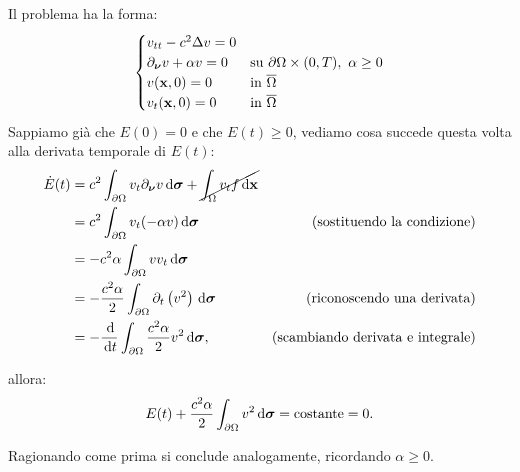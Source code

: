 \begin{dimostrazione}
\begin{itemize}
              Il problema ha la forma:
              \begin{equation*}
                  \begin{cases}
                      v_{tt} -c^{2} \Delta v=0           &                                                                \\
                      \partial _{\bm{\nu }} v+\alpha v=0 & \text{su} \ \partial \Omega \times (0,T) ,\ \alpha \geq 0 \\
                      v(\mathbf{x} ,0) =0                        & \text{in} \ \overline{\Omega }                                 \\
                      v_{t}(\mathbf{x} ,0) =0                    & \text{in} \ \overline{\Omega }
                  \end{cases}
              \end{equation*}Sappiamo già che $E(0) =0$ e che $E(t) \geq 0$, vediamo cosa succede questa volta alla derivata temporale di $E(t)$:
              \begin{align*}
                  \dot{E}(t) & =c^{2}\int _{\partial \Omega } v_{t} \partial _{\bm{\nu }} v\,\mathrm d \bm{\sigma} +\cancel{\int _{\Omega } v_{t} f\,\mathrm d \mathbf{x}} &                                          \\
                             & =c^{2}\int _{\partial \Omega } v_{t}(-\alpha v) \,\mathrm d \bm{\sigma}                                                   & \text{(sostituendo la condizione)}       \\
                             & =-c^{2} \alpha \int _{\partial \Omega } vv_{t} \,\mathrm d \bm{\sigma}                                                    &                                          \\
                             & =-\frac{c^{2} \alpha }{2}\int _{\partial \Omega } \partial _{t}\left(v^{2}\right) \,\mathrm d \bm{\sigma}                 & \text{(riconoscendo una derivata)}       \\
                             & =-\frac{\,\mathrm d}{\,\mathrm d t}\int _{\partial \Omega }\frac{c^{2} \alpha }{2} v^{2} \,\mathrm d \bm{\sigma} ,                          & \text{(scambiando derivata e integrale)}
              \end{align*}

              allora:
              \begin{equation*}
                  E(t) +\frac{c^{2} \alpha }{2}\int _{\partial \Omega } v^{2} \,\mathrm d \bm{\sigma} =\text{costante} =0.
              \end{equation*}

              Ragionando come prima si conclude analogamente, ricordando $\alpha \geq 0$.
    \end{itemize}
\end{dimostrazione}

